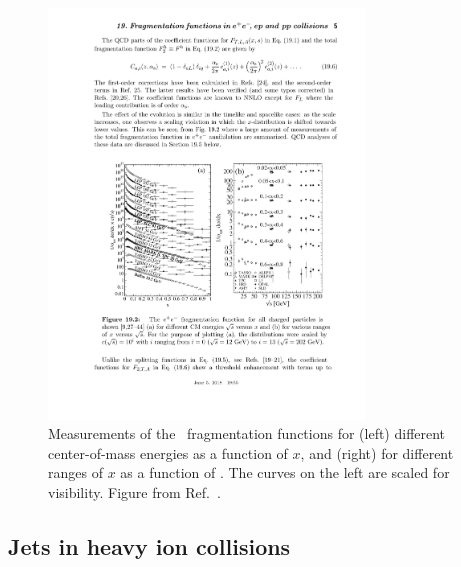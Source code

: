 \begin{figure}[htbp]
\begin{center}
\includegraphics[width=0.75\textwidth]{figures/theory/jetFrag}
\caption{Measurements of the \epm\ fragmentation functions for (left) different center-of-mass energies as a function of $x$, and (right) for different ranges of $x$ as a function of \sqrts. The curves on the left are scaled for visibility. 
Figure from Ref.~\cite{PhysRevD.98.030001}.}
\label{fig:jetFrag}
\end{center}
\end{figure}




\subsection{Jets in heavy ion collisions}

